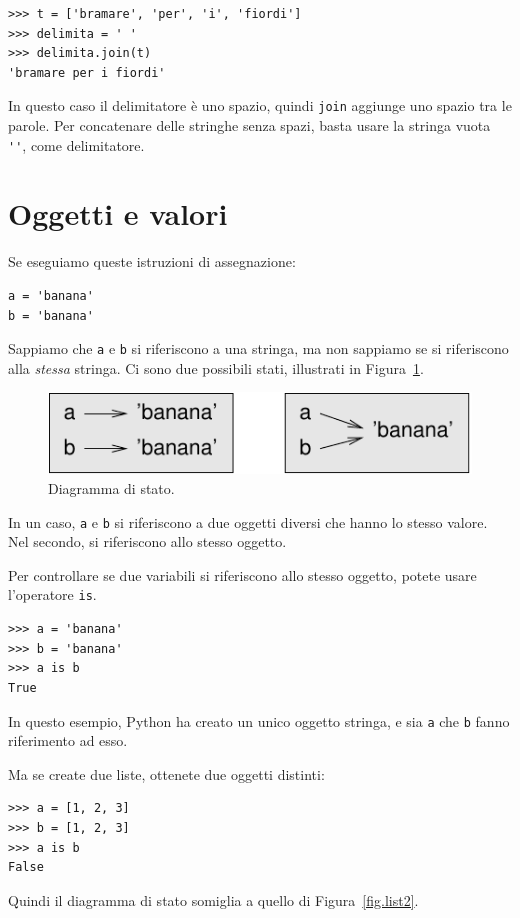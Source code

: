 \documentclass[10pt]{book}
\begin{document}
\begin{verbatim}
>>> t = ['bramare', 'per', 'i', 'fiordi']
>>> delimita = ' '
>>> delimita.join(t)
'bramare per i fiordi'
\end{verbatim}
%
In questo caso il delimitatore è uno spazio, quindi
{\tt join} aggiunge uno spazio tra le parole. Per concatenare delle stringhe senza spazi, basta usare la stringa vuota \verb"''", come delimitatore.


\section{Oggetti e valori}

Se eseguiamo queste istruzioni di assegnazione:

\begin{verbatim}
a = 'banana'
b = 'banana'
\end{verbatim}
%
Sappiamo che {\tt a} e {\tt b} si riferiscono a una stringa, ma non sappiamo se si riferiscono alla {\em stessa} stringa.
Ci sono due possibili stati, illustrati in Figura~\ref{fig.list1}.

\begin{figure}
\centerline
{\includegraphics[scale=0.8]{figs/list1.pdf}}
\caption{Diagramma di stato.}
\label{fig.list1}
\end{figure}


In un caso, {\tt a} e {\tt b} si riferiscono a due oggetti diversi che hanno lo stesso valore. Nel secondo, si riferiscono allo stesso oggetto.

Per controllare se due variabili si riferiscono allo stesso oggetto, potete usare l'operatore {\tt is}.

\begin{verbatim}
>>> a = 'banana'
>>> b = 'banana'
>>> a is b
True
\end{verbatim}
%
In questo esempio, Python ha creato un unico oggetto stringa, e sia {\tt a} che {\tt b} fanno riferimento ad esso.

Ma se create due liste, ottenete due oggetti distinti:

\begin{verbatim}
>>> a = [1, 2, 3]
>>> b = [1, 2, 3]
>>> a is b
False
\end{verbatim}
%
Quindi il diagramma di stato somiglia a quello di Figura~\ref{fig.list2}.
\end{document}
